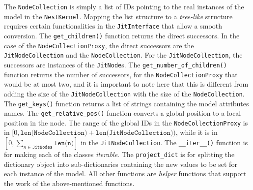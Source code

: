 The \texttt{NodeCollection} is simply a list of IDs pointing to the real instances of the model in the \texttt{NestKernel}. Mapping the list structure to a \emph{tree-like} structure requires certain functionalities in the \texttt{JitInterface} that allow a smooth conversion. The \texttt{get\_children()} function returns the direct successors. In the case of the \texttt{NodeCollectionProxy}, the direct successors are the \texttt{JitNodeCollection} and the \texttt{NodeCollection}. For the \texttt{JitNodeCollection}, the successors are instances of the \texttt{JitNode}s. The \texttt{get\_number\_of\_children()} function returns the number of successors, for the \texttt{NodeCollectionProxy} that would be at most two, and it is important to note here that this is different from adding the size of the \texttt{JitNodeCollection} with the size of the \texttt{NodeCollection}. The \texttt{get\_keys()} function returns a list of strings containing the model attributes names. The \texttt{get\_relative\_pos()} function converts a global position to a local position in the node. The range of the global IDs in the \texttt{NodeCollectionProxy} is in $[0, \texttt{len(NodeCollection)} + \texttt{len(JitNodeCollection)})$, while it is in $[0,\sum_{n \in \texttt{JitNodes}} \texttt{len(n)}]$ in the \texttt{JitNodeCollection}. The \texttt{\_\_iter\_\_()} function is for making each of the classes \emph{iterable}. The \texttt{project\_dict} is for splitting the dictionary object into sub-dictionaries containing the new values to be set for each instance of the model. All other functions are \emph{helper} functions that support the work of the above-mentioned functions.

